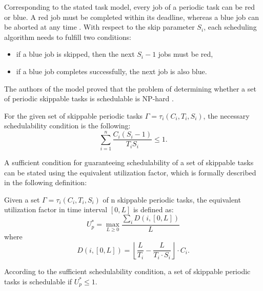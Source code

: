Corresponding to the stated task model, every job of a periodic task can be red or blue.
A red job must be completed within its deadline, whereas a blue job can be aborted at any time 
\cite{buttazzo2011hard}. 
With respect to the skip parameter $S_i$, each scheduling algorithm needs to fulfill two conditions:
\begin{itemize}
	\item if a blue job is skipped, then the next \(S_i - 1\) jobs must be red,
	\item if a blue job completes successfully, the next job is also blue.
\end{itemize}
The authors of the model proved that the problem of determining whether a set of periodic skippable tasks is schedulable is NP-hard \cite{koren1995skip}.

For the given set of skippable periodic tasks \( \Gamma = {\tau_i(C_i,T_i,S_i)} \), the necessary schedulability condition is the following:
\begin{equation}
\sum_{i=1}^{n} \frac{C_i(S_i-1)}{T_i S_i} \leq 1.
\end{equation}

A sufficient condition for guaranteeing schedulability of a set of skippable tasks can be stated 
using the equivalent utilization factor, which is formally described in the following definition:

\begin{mydef}
Given a set \( \Gamma = {\tau_i(C_i,T_i,S_i)} \) of n skippable periodic tasks, the equivalent utilization factor in time interval \([0,L]\) is defined as:
\begin{equation*}
U_p^\ast = \max_{L \geq 0} \frac{\sum_{i}D(i, [0,L])}{L}
\end{equation*}
where
\begin{equation*}
D(i, [0,L]) = \left\lfloor \frac{L}{T_i} - \frac{L}{T_i \cdot S_i}\right\rfloor \cdot C_i.
\end{equation*}
\end{mydef}

According to the sufficient schedulability condition, a set of skippable periodic tasks is schedulable if \( U_p^\ast \leq 1 \).

